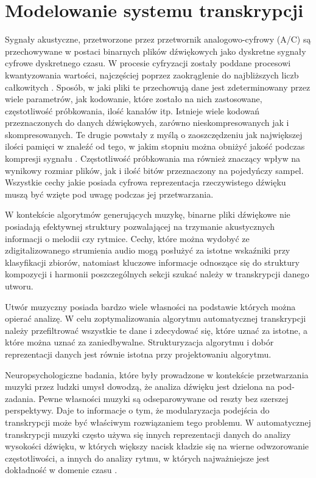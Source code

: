 \documentclass[12pt,a4paper,twoside]{mwart}
\begin{document}
\section{Modelowanie systemu transkrypcji} \label{sec:modelowanieSystemu}
Sygnały akustyczne, przetworzone przez przetwornik analogowo-cyfrowy (A/C) są przechowywane w postaci binarnych plików dźwiękowych jako dyskretne sygnały cyfrowe dyskretnego czasu. W procesie cyfryzacji zostały poddane procesowi kwantyzowania wartości, najczęściej poprzez zaokrąglenie do najbliższych liczb całkowitych \cite[1-4]{CyfrowePrzetwarzanieSygnalowOdTeoriiDoZastosowan}. Sposób, w jaki pliki te przechowują dane jest zdeterminowany przez wiele parametrów, jak kodowanie, które zostało na nich zastosowane, częstotliwość próbkowania, ilość kanałów itp. Istnieje wiele kodowań przeznaczonych do danych dźwiękowych, zarówno nieskompresowanych jak i skompresowanych. Te drugie powstały z myślą o zaoszczędzeniu jak największej ilości pamięci w znaleźć od tego, w jakim stopniu można obniżyć jakość podczas kompresji sygnału \cite[66]{Homerecording:DlaKazdego}. Częstotliwość próbkowania ma również znaczący wpływ na wynikowy rozmiar plików, jak i ilość bitów przeznaczony na pojedyńczy sampel. Wszystkie cechy jakie posiada cyfrowa reprezentacja rzeczywistego dźwięku muszą być wzięte pod uwagę podczas jej przetwarzania.

W kontekście algorytmów generujących muzykę, binarne pliki dźwiękowe nie posiadają efektywnej struktury pozwalającej na trzymanie akustycznych informacji o melodii czy rytmice. Cechy, które można wydobyć ze zdigitalizowanego strumienia audio mogą posłużyć za istotne wskaźniki przy klasyfikacji zbiorów, natomiast kluczowe informacje odnoszące się do struktury kompozycji i harmonii poszczególnych sekcji szukać należy w transkrypcji danego utworu. 

Utwór muzyczny posiada bardzo wiele własności na podstawie których można opierać analizę. W celu zoptymalizowania algorytmu automatycznej transkrypcji należy przefiltrować wszystkie te dane i zdecydować się, które uznać za istotne, a które można uznać za zaniedbywalne. Strukturyzacja algorytmu i dobór reprezentacji danych jest równie istotna przy projektowaniu algorytmu.

Neuropsychologiczne badania, które były prowadzone w kontekście przetwarzania muzyki przez ludzki umysł dowodzą, że analiza dźwięku jest dzielona na pod-zadania. Pewne własności muzyki są odseparowywane od reszty bez szerszej perspektywy. Daje to informacje o tym, że modularyzacja podejścia do transkrypcji może być właściwym rozwiązaniem tego problemu. W automatycznej transkrypcji muzyki często używa się innych reprezentacji danych do analizy wysokości dźwięku, w których większy nacisk kładzie się na wierne odwzorowanie częstotliwości, a innych do analizy rytmu, w których najważniejsze jest dokładność w domenie czasu \cite[37-46]{Transcription:Zatorre:AuditoryCortex}\cite[231-246]{Transcription:Tervaniemi:AuditoryCortexFunctions}.
\end{document}
